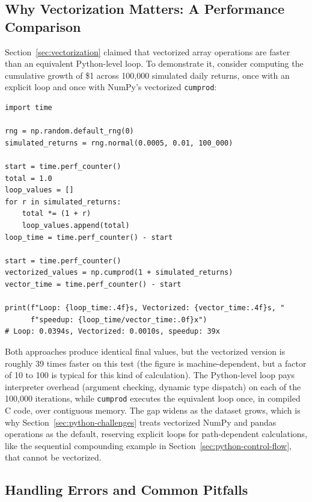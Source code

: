 \documentclass[../ai_in_finance]{subfiles}
\begin{document}
\subsection{Why Vectorization Matters: A Performance Comparison}
\label{sec:vectorization-performance}

Section~\ref{sec:vectorization} claimed that vectorized array operations are faster than an equivalent Python-level loop. To demonstrate it, consider computing the cumulative growth of \$1 across 100,000 simulated daily returns, once with an explicit loop and once with NumPy's vectorized \texttt{cumprod}:

\begin{verbatim}
import time

rng = np.random.default_rng(0)
simulated_returns = rng.normal(0.0005, 0.01, 100_000)

start = time.perf_counter()
total = 1.0
loop_values = []
for r in simulated_returns:
    total *= (1 + r)
    loop_values.append(total)
loop_time = time.perf_counter() - start

start = time.perf_counter()
vectorized_values = np.cumprod(1 + simulated_returns)
vector_time = time.perf_counter() - start

print(f"Loop: {loop_time:.4f}s, Vectorized: {vector_time:.4f}s, "
      f"speedup: {loop_time/vector_time:.0f}x")
# Loop: 0.0394s, Vectorized: 0.0010s, speedup: 39x
\end{verbatim}

Both approaches produce identical final values, but the vectorized version is roughly 39 times faster on this test (the figure is machine-dependent, but a factor of 10 to 100 is typical for this kind of calculation).
The Python-level loop pays interpreter overhead (argument checking, dynamic type dispatch) on each of the 100,000 iterations, while \texttt{cumprod} executes the equivalent loop once, in compiled C code, over contiguous memory. The gap widens as the dataset grows, which is why Section~\ref{sec:python-challenges} treats vectorized NumPy and pandas operations as the default, reserving explicit loops for path-dependent calculations, like the sequential compounding example in Section~\ref{sec:python-control-flow}, that cannot be vectorized.

\subsection{Handling Errors and Common Pitfalls}
\end{document}
